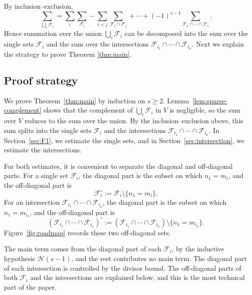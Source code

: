 By inclusion--exclusion,
\begin{equation}\label{eq:IE-general}
\sum_{\bigcup_i\mathscr{F}_i}
= \sum_i\sum_{\mathscr{F}_i} - \sum_{i<j}\sum_{\mathscr{F}_i\cap\mathscr{F}_j} + \cdots
+ (-1)^{s-1}\sum_{\mathscr{F}_1\cap\cdots\cap\mathscr{F}_s}.
\end{equation}
\label{lem:inclusion-exclusion}
Hence summation over the union $\bigcup_i\mathscr{F}_i$ can be decomposed into the sum over the single sets $\mathscr{F}_i$ and the sum over the intersections $\mathscr{F}_{i_1}\cap\cdots\cap\mathscr{F}_{i_\kappa}$.
Next we explain the strategy to prove Theorem \ref{thm:main}.
\subsection{Proof strategy}
\label{sec:proof-strategy}
We prove Theorem~\ref{thm:main} by induction on \(s\geq 2\). Lemma~\ref{lem:sparse-complement} shows that the complement of \(\bigcup_i\mathscr{F}_i\) in \(V\) is negligible, so the sum over \(V\) reduces to the sum over the union. By the inclusion--exclusion above, this sum splits into the single sets \(\mathscr{F}_i\) and the intersections \(\mathscr{F}_{i_1}\cap\cdots\cap\mathscr{F}_{i_\kappa}\). In Section~\ref{sec:F1}, we estimate the single sets, and in Section~\ref{sec:intersection}, we estimate the intersections.

For both estimates, it is convenient to separate the diagonal and off-diagonal parts.
For a single set \(\mathscr{F}_i\), the diagonal part is the subset on which \(n_1=m_i\), and the off-diagonal part is
\[
\mathscr{F}_i^\circ:=\mathscr{F}_i\setminus\{n_1=m_i\}.
\]
For an intersection \(\mathscr{F}_{i_1}\cap\cdots\cap\mathscr{F}_{i_\kappa}\), the diagonal part is the subset on which \(n_1=m_{i_1}\), and the off-diagonal part is
\[
(\mathscr{F}_{i_1}\cap\cdots\cap\mathscr{F}_{i_\kappa})^\circ
:=(\mathscr{F}_{i_1}\cap\cdots\cap\mathscr{F}_{i_\kappa})\setminus\{n_1=m_{i_1}\}.
\]
Figure~\ref{fig:roadmap} records these two off-diagonal sets.

The main term comes from the diagonal part of each \(\mathscr{F}_i\), by the inductive hypothesis \(\mathcal{H}(s-1)\), and the rest contributes no main term. The diagonal part of each intersection is controlled by the divisor bound. The off-diagonal parts of both \(\mathscr{F}_i\) and the intersections are explained below, and this is the most technical part of the paper.


